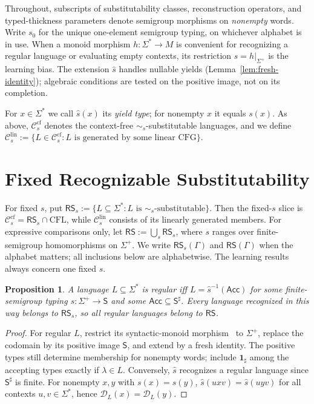 \documentclass[11pt,a4paper]{article}
\newtheorem{proposition}[theorem]{Proposition}
\theoremstyle{remark}
\theoremstyle{plain}
\newcommand{\D}{\mathcal{D}}
\newcommand{\cf}{\mathrm{cf}}
\newcommand{\lin}{\mathrm{lin}}
\newcommand{\Ccf}[1]{\mathcal C_{#1}^{\cf}}
\newcommand{\Clin}[1]{\mathcal C_{#1}^{\lin}}
\begin{document}
Throughout, subscripts of substitutability classes,
reconstruction operators, and typed-thickness parameters
denote semigroup morphisms on \emph{nonempty} words.
Write $s_0$ for the unique one-element semigroup typing,
on whichever alphabet is in use. When a monoid morphism
$h:\Sigma^*\to M$ is convenient for recognizing a regular
language or evaluating empty contexts, its restriction
$s=h|_{\Sigma^+}$ is the learning bias. The extension
$\widehat s$ handles nullable yields
(Lemma~\ref{lem:fresh-identity}); algebraic conditions
are tested on the positive image, not on its completion.

For $x\in\Sigma^*$ we call $\widehat s(x)$ its \emph{yield type};
for nonempty $x$ it equals $s(x)$.  As above, $\Ccf{s}$ denotes the context-free
$\sim_s$-substitutable languages, and we define
$\Clin{s}:=\{L\in\Ccf{s}:L\text{ is generated by some linear CFG}\}$.

\section{Fixed Recognizable Substitutability}
\label{sec:framework}

For fixed $s$, put
$\mathsf{RS}_s:=\{L\subseteq\Sigma^*:L\text{ is $\sim_s$-substitutable}\}$.
Then the fixed-$s$ slice is
$\Ccf{s}=\mathsf{RS}_s\cap\mathrm{CFL}$, while $\Clin{s}$ consists
of its linearly generated members.  For expressive comparisons only, let
$\mathsf{RS}:=\bigcup_s\mathsf{RS}_s$, where $s$ ranges over finite-semigroup
homomorphisms on $\Sigma^+$.  We write $\mathsf{RS}_s(\Gamma)$ and
$\mathsf{RS}(\Gamma)$ when the alphabet matters; all inclusions below are
alphabetwise.  The learning results always concern one fixed $s$.

\begin{proposition}\label{prop:regular-auto}
A language $L\subseteq\Sigma^*$ is regular iff
$L=\widehat s^{-1}(\mathsf{Acc})$ for some finite-semigroup
typing $s:\Sigma^+\to\mathsf S$ and some
$\mathsf{Acc}\subseteq\mathsf S^\sharp$.
Every language recognized in this way belongs to
$\mathsf{RS}_s$, so all regular languages belong to
$\mathsf{RS}$.
\end{proposition}
\begin{proof}
For regular $L$, restrict its syntactic-monoid
morphism~\cite[Chapter~III, Proposition~10.2]{eilenberg1974}
to $\Sigma^+$, replace the codomain by
its positive image $\mathsf S$, and extend by a
fresh identity.  The positive types still determine
membership for nonempty words; include $\mathbf{1}_{\sharp}$
among the accepting types exactly if $\lambda\in L$.
Conversely, $\widehat s$ recognizes a regular
language since $\mathsf S^\sharp$ is finite.
For nonempty $x,y$ with $s(x)=s(y)$,
$\widehat s(uxv)=\widehat s(uyv)$ for all contexts
$u,v\in\Sigma^*$, hence $\D_L(x)=\D_L(y)$.
\end{proof}
\end{document}
